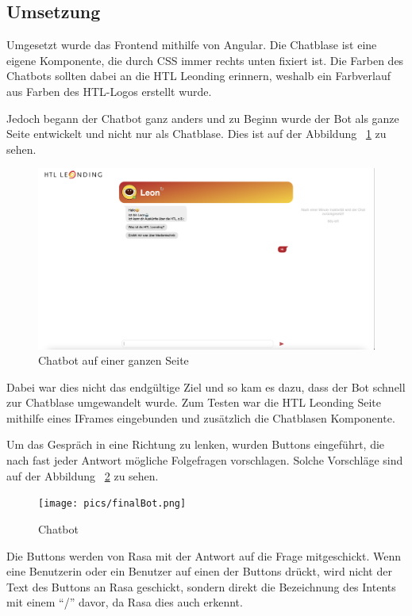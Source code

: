 \subsection{Umsetzung}
Umgesetzt wurde das Frontend mithilfe von Angular.
Die Chatblase ist eine eigene Komponente, die durch CSS immer rechts unten fixiert ist.
Die Farben des Chatbots sollten dabei an die HTL Leonding erinnern, weshalb ein Farbverlauf aus Farben des HTL-Logos erstellt wurde.

Jedoch begann der Chatbot ganz anders und zu Beginn wurde der Bot als ganze Seite entwickelt und nicht nur als Chatblase.
Dies ist auf der Abbildung ~\ref{fig:impl:conceptBotFullPage} zu sehen.

\begin{figure}[hbt!]
    \centering
    \includegraphics[scale=0.2]{pics/fullPageBot}
    \caption{Chatbot auf einer ganzen Seite}
    \label{fig:impl:conceptBotFullPage}
\end{figure}

Dabei war dies nicht das endgültige Ziel und so kam es dazu, dass der Bot schnell zur Chatblase umgewandelt wurde.
Zum Testen war die HTL Leonding Seite mithilfe eines IFrames eingebunden und zusätzlich die Chatblasen Komponente.

Um das Gespräch in eine Richtung zu lenken, wurden Buttons eingeführt, die nach fast jeder Antwort mögliche Folgefragen vorschlagen.
Solche Vorschläge sind auf der Abbildung ~\ref{fig:impl:bot} zu sehen.

\begin{figure}[hbt!]
    \centering
    \texttt{[image: pics/finalBot.png]}
    \caption{Chatbot}
    \label{fig:impl:bot}
\end{figure}

Die Buttons werden von Rasa mit der Antwort auf die Frage mitgeschickt.
Wenn eine Benutzerin oder ein Benutzer auf einen der Buttons drückt, wird nicht der Text des Buttons an Rasa geschickt, sondern direkt die Bezeichnung des Intents mit einem ``/'' davor, da Rasa dies auch erkennt.

